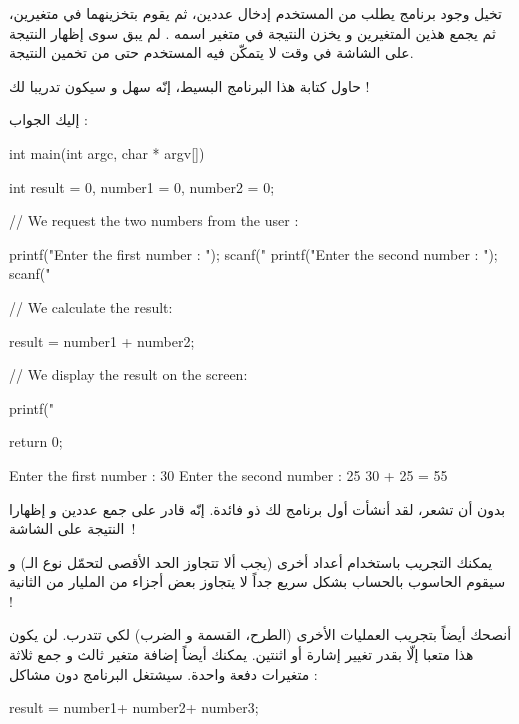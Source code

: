 تخيل وجود برنامج يطلب من المستخدم إدخال عددين، ثم يقوم بتخزينهما في متغيرين، ثم يجمع هذين المتغيرين و يخزن النتيجة في متغير اسمه
.
لم يبق سوى إظهار النتيجة على الشاشة في وقت لا يتمكّن فيه المستخدم حتى من تخمين النتيجة.

حاول كتابة هذا البرنامج البسيط، إنّه سهل و سيكون تدريبا لك !

إليك الجواب :

\begin{Csource}
int main(int argc, char * argv[])
{
  int result = 0, number1 = 0, number2 = 0;

  // We request the two numbers from the user :

  printf("Enter the first number : ");
  scanf("%
  printf("Enter the second number : ");
  scanf("%

  // We calculate the result:

  result = number1 + number2;

  // We display the result on the screen:

  printf("%

  return 0;
}
\end{Csource}

\begin{Console}
  Enter the first number : 30
  Enter the second number : 25
  30 + 25 = 55
\end{Console}

بدون أن تشعر، لقد أنشأت أول برنامج لك ذو فائدة. إنّه قادر على جمع عددين و إظهارا النتيجة على الشاشة~!

يمكنك التجريب باستخدام أعداد أخرى (يجب ألا تتجاوز الحد الأقصى لتحمّل نوع الـ)
و سيقوم الحاسوب بالحساب بشكل سريع جداً لا يتجاوز بعض أجزاء من المليار من الثانية !

أنصحك أيضاً بتجريب العمليات الأخرى (الطرح، القسمة و الضرب) لكي تتدرب. لن يكون هذا متعبا إلّا بقدر تغيير إشارة أو اثنتين. يمكنك أيضاً إضافة متغير ثالث و جمع ثلاثة متغيرات دفعة واحدة. سيشتغل البرنامج دون مشاكل :

\begin{Csource}
result = number1+ number2+ number3;
\end{Csource}
